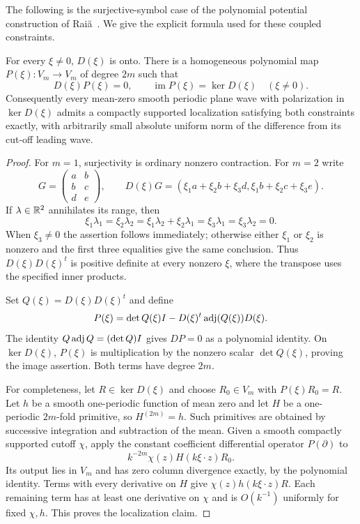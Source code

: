 The following is the surjective-symbol case of the polynomial
potential construction of Rai\u a~\cite[Theorem~1 and Section~2]{Raita}.
We give the explicit formula used for these coupled constraints.

\begin{lemma}
\label{sc:polynomial-potential}
For every $\xi\ne0$, $D(\xi)$ is onto. There is a homogeneous
polynomial map $P(\xi):V_m\to V_m$ of degree $2m$ such that
\[
 D(\xi)P(\xi)=0,\qquad
 \operatorname{im}P(\xi)=\ker D(\xi)\quad(\xi\ne0).
\]
Consequently every mean-zero smooth periodic plane wave with
polarization in $\ker D(\xi)$ admits a compactly supported
localization satisfying both constraints exactly, with arbitrarily
small absolute uniform norm of the difference from its cut-off
leading wave.
\end{lemma}

\begin{proof}
For $m=1$, surjectivity is ordinary nonzero contraction. For $m=2$
write
\[
 G=\begin{pmatrix}a&b\\b&c\\d&e\end{pmatrix},\qquad
 D(\xi)G=(\xi_1a+\xi_2b+\xi_3d,
           \xi_1b+\xi_2c+\xi_3e).
\]
If $\lambda\in\mathbb R^2$ annihilates its range, then
\[
 \xi_1\lambda_1=\xi_2\lambda_2
 =\xi_1\lambda_2+\xi_2\lambda_1
 =\xi_3\lambda_1=\xi_3\lambda_2=0.
\]
When $\xi_3\ne0$ the assertion follows immediately; otherwise
either $\xi_1$ or $\xi_2$ is nonzero and the first three equalities
give the same conclusion. Thus $D(\xi)D(\xi)^t$ is positive
definite at every nonzero $\xi$, where the transpose uses the
specified inner products.

Set $Q(\xi)=D(\xi)D(\xi)^t$ and define
\begin{equation}
 \label{sc:polynomial-symbol}
 P(\xi)=\det Q(\xi)I
       -D(\xi)^t\operatorname{adj}(Q(\xi))D(\xi).
\end{equation}
The identity $Q\operatorname{adj}Q=(\det Q)I$ gives $DP=0$
as a polynomial identity. On $\ker D(\xi)$, $P(\xi)$ is
multiplication by the nonzero scalar $\det Q(\xi)$, proving the
image assertion. Both terms have degree $2m$.

For completeness, let $R\in\ker D(\xi)$ and choose
$R_0\in V_m$ with $P(\xi)R_0=R$. Let $h$ be a smooth
one-periodic function of mean zero and let $H$ be a one-periodic
$2m$-fold primitive, so $H^{(2m)}=h$. Such primitives are obtained
by successive integration and subtraction of the mean. Given a
smooth compactly supported cutoff $\chi$, apply the constant
coefficient differential operator $P(\partial)$ to
\begin{equation}
 \label{sc:localized-potential}
 k^{-2m}\chi(z)H(k\xi\cdot z)R_0.
\end{equation}
Its output lies in $V_m$ and has zero column divergence exactly,
by the polynomial identity. Terms with every derivative on $H$
give $\chi(z)h(k\xi\cdot z)R$. Each remaining term has at least
one derivative on $\chi$ and is $O(k^{-1})$ uniformly for fixed
$\chi,h$. This proves the localization claim.
\end{proof}

